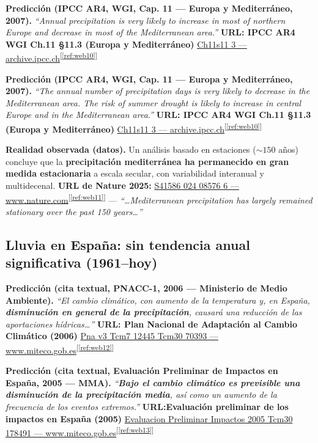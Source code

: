 \documentclass[
  10pt,
  a4paper,
  DIV=11,
  numbers=noendperiod,
  open=any]{scrreprt}
\numberwithin{equation}{chapter}
\numberwithin{equation}{section}
\renewcommand{\[}{\begin{equation}}
\renewcommand{\]}{\end{equation}}
\newcommand{\refweb}[3]{%
  \href{#1}{#2}\textsuperscript{[\ref{ref:#3}]}%
}
\begin{document}
\textbf{Predicción (IPCC AR4, WGI, Cap. 11 — Europa y Mediterráneo, 2007).}
\emph{“Annual precipitation is very likely to increase in most of northern Europe and decrease in most of the Mediterranean area.”}
\textbf{URL: IPCC AR4 WGI Ch.11 §11.3 (Europa y Mediterráneo)} \refweb{https://archive.ipcc.ch/publications_and_data/ar4/wg1/en/ch11s11-3.html}{Ch11s11 3 — archive.ipcc.ch}{web10}

\textbf{Predicción (IPCC AR4, WGI, Cap. 11 — Europa y Mediterráneo, 2007).}
\emph{“The annual number of precipitation days is very likely to decrease in the Mediterranean area. The risk of summer drought is likely to increase in central Europe and in the Mediterranean area.”}
\textbf{URL: IPCC AR4 WGI Ch.11 §11.3 (Europa y Mediterráneo)} \refweb{https://archive.ipcc.ch/publications_and_data/ar4/wg1/en/ch11s11-3.html}{Ch11s11 3 — archive.ipcc.ch}{web10}


\textbf{Realidad observada (datos).}
Un análisis basado en estaciones (\(\sim150\) años) concluye que la \textbf{precipitación mediterránea ha permanecido en gran medida estacionaria} a escala secular, con variabilidad interanual y multidecenal.
\textbf{URL de Nature 2025:} \refweb{https://www.nature.com/articles/s41586-024-08576-6}{S41586 024 08576 6 — www.nature.com}{web11} — \emph{“\dots{}Mediterranean precipitation has largely remained stationary over the past 150 years\dots{}”}

\medskip

\subsection{Lluvia en España: sin tendencia anual significativa (1961–hoy)}

\textbf{Predicción (cita textual, PNACC-1, 2006 — Ministerio de Medio Ambiente).}
\emph{“El cambio climático, con aumento de la temperatura y, en España, \textbf{disminución en general de la precipitación}, causará una reducción de las aportaciones hídricas…”}
\textbf{URL: Plan Nacional de Adaptación al Cambio Climático (2006)} \refweb{https://www.miteco.gob.es/content/dam/miteco/es/cambio-climatico/temas/impactos-vulnerabilidad-y-adaptacion/pna_v3_tcm7-12445_tcm30-70393.pdf}{Pna v3 Tcm7 12445 Tcm30 70393 — www.miteco.gob.es}{web12}

\medskip

\textbf{Predicción (cita textual, Evaluación Preliminar de Impactos en España, 2005 — MMA).}
\emph{“\textbf{Bajo el cambio climático es previsible una disminución de la precipitación media}, así como un aumento de la frecuencia de los eventos extremos.”}
\textbf{URL:Evaluación preliminar de los impactos en España (2005)} \refweb{https://www.miteco.gob.es/content/dam/miteco/es/cambio-climatico/temas/impactos-vulnerabilidad-y-adaptacion/evaluacion_preliminar_impactos_2005_tcm30-178491.pdf}{Evaluacion Preliminar Impactos 2005 Tcm30 178491 — www.miteco.gob.es}{web13}
\end{document}
